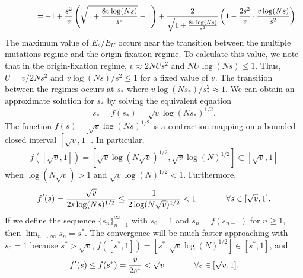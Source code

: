 \documentclass[11pt,onecolumn]{article}
\begin{document}
\[
\begin{aligned}
\hspace{.55in} & = -1+\frac{s^2}{v} \left( \sqrt{1+\frac{8v\log(Ns)}{s^2}}-1\right) + \frac{2}{\sqrt{1+\frac{8v\log(Ns)}{s^2}}} \left(1-\frac{2s^2}{v}\cdot\frac{v\log(Ns)}{s^2}\right)
\end{aligned}
\]
The maximum value of $E_s/E_U$ occurs near the transition between the multiple mutations regime and the origin-fixation regime. To calculate this value, we note that in the origin-fixation regime, $v \approx 2NUs^2$ and $NU\log(Ns)\leq 1$. Thus, $U=v/2Ns^2$ and $v\log(Ns)/s^2 \leq 1$ for a fixed value of $v$. The transition between the regimes occurs at $s_*$ where $v\log(Ns_*)/s_*^2 \approx 1$. We can obtain an approximate solution for $s_*$ by solving the equivalent equation
\[
s_*=f(s_*) = \sqrt{v}\log(Ns_*)^{1/2}.
\]
The function $f(s)=\sqrt{v}\log(Ns)^{1/2}$ is a contraction mapping on a bounded closed interval $[\sqrt{v},1]$. In particular, 
\[
f([\sqrt{v},1])=[\sqrt{v}\log(N\sqrt{v})^{1/2},\sqrt{v}\log(N)^{1/2}]\subset[\sqrt{v},1]
\] 
when $\log(N\sqrt{v})> 1$ and $\sqrt{v}\log(N)^{1/2}<1$. Furthermore, 
\[
f'(s) =\frac{\sqrt{v}}{2s\log(Ns)^{1/2}} \leq \frac{1}{2\log(N\sqrt{v})^{1/2}} < 1 \hspace{.5in} \forall s \in [\sqrt{v},1].
\]
If we define the sequence $\{s_n\}_{n=1}^{\infty}$ with $s_0=1$ and $s_n=f(s_{n-1})$ for $n\geq1$, then $\lim_{n\rightarrow \infty} s_n = s^*$. The convergence will be much faster approaching with $s_0=1$ because $s^*> \sqrt{v}$, $f([s^*,1]) = [s^*,\sqrt{v}\log(N)^{1/2}]\in [s^*,1]$, and 
\[
f'(s) \leq f(s^*)= \frac{v}{2s^*} < \sqrt{v} \hspace{.5in} \forall s \in [\sqrt{v},1].
\]
\end{document}
